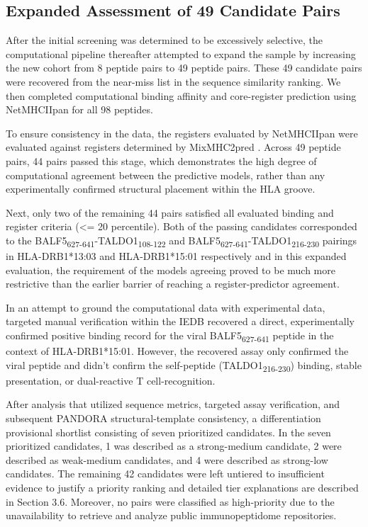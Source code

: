 \documentclass[11pt]{article}
\begin{document}
\subsection{Expanded Assessment of 49 Candidate Pairs}
After the initial screening was determined to be excessively selective, the computational pipeline thereafter attempted to expand the sample by increasing the new cohort from 8 peptide pairs to 49 peptide pairs. These 49 candidate pairs were recovered from the near-miss list in the sequence similarity ranking. We then completed computational binding affinity and core-register prediction using NetMHCIIpan for all 98 peptides.

To ensure consistency in the data, the registers evaluated by NetMHCIIpan were evaluated against registers determined by MixMHC2pred \cite{mix2019,mix2023}. Across 49 peptide pairs, 44 pairs passed this stage, which demonstrates the high degree of computational agreement between the predictive models, rather than any experimentally confirmed structural placement within the HLA groove.

Next, only two of the remaining 44 pairs satisfied all evaluated binding and register criteria (<= 20 percentile). Both of the passing candidates corresponded to the BALF5\textsubscript{627-641}-TALDO1\textsubscript{108-122} and BALF5\textsubscript{627-641}-TALDO1\textsubscript{216-230} pairings in HLA-DRB1*13:03 and HLA-DRB1*15:01 respectively and in this expanded evaluation, the requirement of the models agreeing proved to be much more restrictive than the earlier barrier of reaching a register-predictor agreement.

In an attempt to ground the computational data with experimental data, targeted manual verification within the IEDB recovered a direct, experimentally confirmed positive binding record for the viral BALF5\textsubscript{627-641} peptide in the context of HLA-DRB1*15:01. However, the recovered assay only confirmed the viral peptide and didn’t confirm the self-peptide (TALDO1\textsubscript{216-230}) binding, stable presentation, or dual-reactive T cell-recognition.

After analysis that utilized sequence metrics, targeted assay verification, and subsequent PANDORA structural-template consistency, a differentiation provisional shortlist consisting of seven prioritized candidates. In the seven prioritized candidates, 1 was described as a strong-medium candidate, 2 were described as weak-medium candidates, and 4 were described as strong-low candidates. The remaining 42 candidates were left untiered to insufficient evidence to justify a priority ranking and detailed tier explanations are described in Section 3.6. Moreover, no pairs were classified as high-priority due to the unavailability to retrieve and analyze public immunopeptidome repositories.
\end{document}
